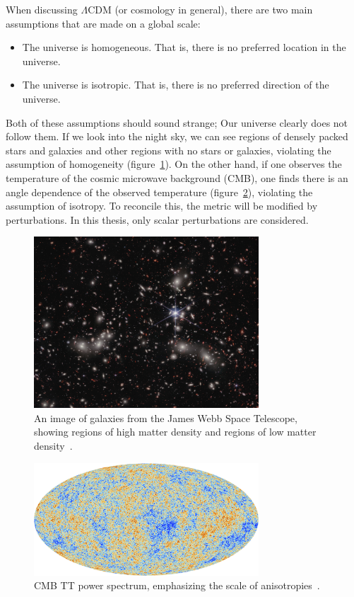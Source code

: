 When discussing $\Lambda$CDM (or cosmology in general), there are two main assumptions that are made on a global scale:
\begin{itemize}
    \item The universe is homogeneous. That is, there is no preferred location in the universe.
    \item The universe is isotropic. That is, there is no preferred direction of the universe.
\end{itemize}
Both of these assumptions should sound strange; Our universe clearly does not follow them. If we look into the night sky, we can see regions of densely packed stars and galaxies and other regions with no stars or galaxies, violating the assumption of homogeneity (figure~\ref{fig:galaxy_map}). On the other hand, if one observes the temperature of the cosmic microwave background (CMB), one finds there is an angle dependence of the observed temperature (figure~\ref{fig:cmb_tt_map}), violating the assumption of isotropy. To reconcile this, the metric will be modified by perturbations. In this thesis, only scalar perturbations are considered.
\begin{figure}[ht]
    \centering
    \includegraphics[width=0.75\textwidth]{plots/weic2305a.jpg}
    \caption{An image of galaxies from the James Webb Space Telescope, showing regions of high matter density and regions of low matter density~\cite{webb_clusters}.}
    \label{fig:galaxy_map}
\end{figure}
\begin{figure}[ht]
    \centering
    \includegraphics[width=0.75\textwidth]{plots/Planck_CMB.jpg}
    \caption{CMB TT power spectrum, emphasizing the scale of anisotropies~\cite{planck_CMB}.}
    \label{fig:cmb_tt_map}
\end{figure}

